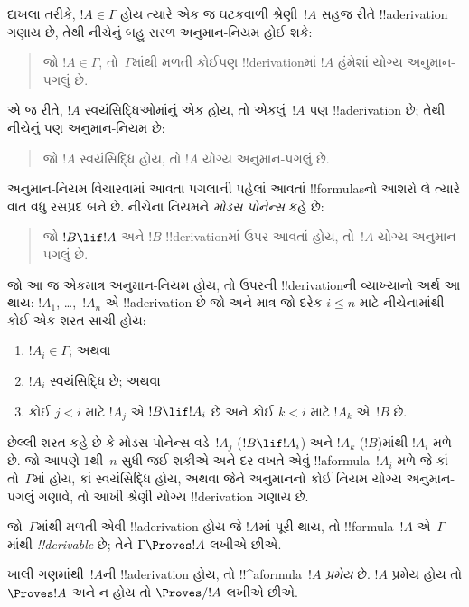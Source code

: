 \documentclass[../../../include/open-logic-section]{subfiles}
\begin{document}
દાખલા તરીકે, $!A \in \Gamma$ હોય ત્યારે એક જ ઘટકવાળી શ્રેણી~$!A$
સહજ રીતે !!a{derivation} ગણાય છે, તેથી નીચેનું બહુ સરળ અનુમાન-નિયમ હોઈ
શકે:
\begin{quote}
  જો $!A \in \Gamma$, તો~$\Gamma$માંથી મળતી કોઈપણ !!{derivation}માં
  $!A$ હંમેશાં યોગ્ય અનુમાન-પગલું છે.
\end{quote}
એ જ રીતે, $!A$ સ્વયંસિદ્ધિઓમાંનું એક હોય, તો એકલું~$!A$ પણ
!!a{derivation} છે; તેથી નીચેનું પણ અનુમાન-નિયમ છે:
\begin{quote}
  જો $!A$ સ્વયંસિદ્ધિ હોય, તો $!A$ યોગ્ય અનુમાન-પગલું છે.
\end{quote}
અનુમાન-નિયમ વિચારવામાં આવતા પગલાની પહેલાં આવતાં !!{formula}sનો આશરો
લે ત્યારે વાત વધુ રસપ્રદ બને છે. નીચેના નિયમને \emph{મોડસ પોનેન્સ}
કહે છે:
\begin{quote}
  જો $!B \lif !A$ અને $!B$ !!{derivation}માં ઉપર આવતાં હોય, તો~$!A$
  યોગ્ય અનુમાન-પગલું છે.
\end{quote}
જો આ જ એકમાત્ર અનુમાન-નિયમ હોય, તો ઉપરની !!{derivation}ની વ્યાખ્યાનો
અર્થ આ થાય: $!A_1$, \dots,~$!A_n$ એ !!a{derivation} છે જો અને માત્ર
જો દરેક $i \le n$ માટે નીચેનામાંથી કોઈ એક શરત સાચી હોય:
\begin{enumerate}
\item $!A_i \in \Gamma$; અથવા
\item $!A_i$ સ્વયંસિદ્ધિ છે; અથવા
\item કોઈ $j < i$ માટે $!A_j$ એ $!B \lif !A_i$ છે અને કોઈ $k < i$
  માટે $!A_k$ એ~$!B$ છે.
\end{enumerate}
છેલ્લી શરત કહે છે કે મોડસ પોનેન્સ વડે~$!A_j$ ($!B \lif !A_i$) અને
$!A_k$ ($!B$)માંથી $!A_i$ મળે છે. જો આપણે $1$થી~$n$ સુધી જઈ શકીએ અને
દર વખતે એવું !!a{formula}~$!A_i$ મળે જે કાં તો~$\Gamma$માં હોય, કાં
સ્વયંસિદ્ધિ હોય, અથવા જેને અનુમાનનો કોઈ નિયમ યોગ્ય અનુમાન-પગલું ગણાવે,
તો આખી શ્રેણી યોગ્ય !!{derivation} ગણાય છે.

\begin{defn}[!!^{derivability}]
જો~$\Gamma$માંથી મળતી એવી !!a{derivation} હોય જે $!A$માં પૂરી થાય,
તો !!{formula}~$!A$ એ~$\Gamma$માંથી \emph{!!{derivable}} છે; તેને
$\Gamma \Proves !A$ લખીએ છીએ.
\end{defn}

\begin{defn}[પ્રમેયો]
ખાલી ગણમાંથી~$!A$ની !!a{derivation} હોય, તો !!^a{formula}~$!A$
\emph{પ્રમેય} છે. $!A$ પ્રમેય હોય તો $\Proves !A$ અને ન હોય તો
$\Proves/ !A$ લખીએ છીએ.
\end{defn}
\end{document}
